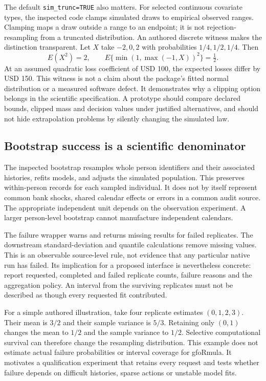 The default \texttt{sim\_trunc=TRUE} also matters. For selected continuous covariate types, the inspected code clamps simulated draws to empirical observed ranges. Clamping maps a draw outside a range to an endpoint; it is not rejection-resampling from a truncated distribution. An authored discrete witness makes the distinction transparent. Let $X$ take $-2,0,2$ with probabilities $1/4,1/2,1/4$. Then
\begin{equation}
 E(X^2)=2,\qquad
 E\{\min(1,\max(-1,X))^2\}=\tfrac12.
 \label{exec20:gformula-clipping}
\end{equation}
At an assumed quadratic loss coefficient of USD 100, the expected losses differ by USD 150. This witness is not a claim about the package's fitted normal distribution or a measured software defect. It demonstrates why a clipping option belongs in the scientific specification. A prototype should compare declared bounds, clipped mass and decision values under justified alternatives, and should not hide extrapolation problems by silently changing the simulated law.~\citep{exec20_gformula_reference}

\subsection{Bootstrap success is a scientific denominator}
\label{exec20:gformula-uncertainty}
The inspected bootstrap resamples whole person identifiers and their associated histories, refits models, and adjusts the simulated population. This preserves within-person records for each sampled individual. It does not by itself represent common bank shocks, shared calendar effects or errors in a common audit source. The appropriate independent unit depends on the observation experiment. A larger person-level bootstrap cannot manufacture independent calendars.~\citep{exec20_gformula_reuse}

The failure wrapper warns and returns missing results for failed replicates. The downstream standard-deviation and quantile calculations remove missing values. This is an observable source-level rule, not evidence that any particular native run has failed. Its implication for a proposed interface is nevertheless concrete: report requested, completed and failed replicate counts, failure reasons and the aggregation policy. An interval from the surviving replicates must not be described as though every requested fit contributed.

For a simple authored illustration, take four replicate estimates $(0,1,2,3)$. Their mean is $3/2$ and their sample variance is $5/3$. Retaining only $(0,1)$ changes the mean to $1/2$ and the sample variance to $1/2$. Selective computational survival can therefore change the resampling distribution. This example does not estimate actual failure probabilities or interval coverage for gfoRmula. It motivates a qualification experiment that retains every request and tests whether failure depends on difficult histories, sparse actions or unstable model fits.~\citep{exec20_gformula_reference}

